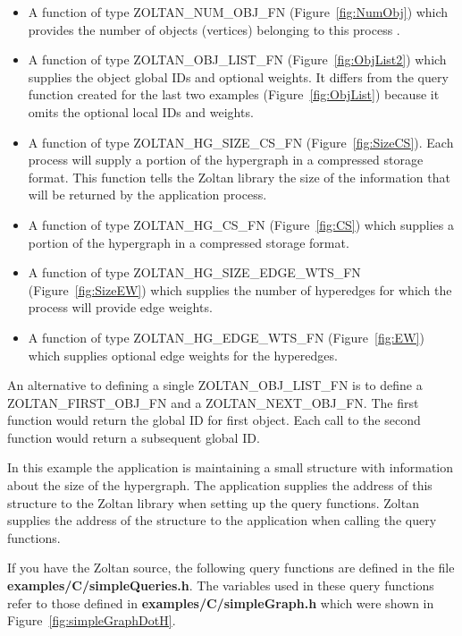 \begin{itemize}
\item A function of type ZOLTAN\_NUM\_OBJ\_FN (Figure~\ref{fig:NumObj}) which provides the number of objects (vertices) belonging to this process .
\item A function of type ZOLTAN\_OBJ\_LIST\_FN (Figure~\ref{fig:ObjList2}) which supplies the object global IDs and optional weights.  It differs from the query function created for the last two examples (Figure~\ref{fig:ObjList}) because it omits the optional local IDs and weights.
\item A function of type ZOLTAN\_HG\_SIZE\_CS\_FN (Figure~\ref{fig:SizeCS}).  Each process will supply a portion of the hypergraph in a compressed storage format.  This function tells the Zoltan library the size of the information that will be returned by the application process.
\item A function of type ZOLTAN\_HG\_CS\_FN (Figure~\ref{fig:CS}) which supplies a portion of the hypergraph in a compressed storage format.
\item A function of type ZOLTAN\_HG\_SIZE\_EDGE\_WTS\_FN (Figure~\ref{fig:SizeEW}) which supplies the number of hyperedges for which the process will provide edge weights.
\item A function of type ZOLTAN\_HG\_EDGE\_WTS\_FN (Figure~\ref{fig:EW}) which supplies optional edge weights for the hyperedges.
\end{itemize}

An alternative to defining a single ZOLTAN\_OBJ\_LIST\_FN is to define
a ZOLTAN\_FIRST\_OBJ\_FN and a ZOLTAN\_NEXT\_OBJ\_FN.  The first function
would return the global ID for first object.  Each call to the second function would
return a subsequent global ID.

In this example the application is maintaining a small structure
with information about the size of the hypergraph.  The application
supplies the address of this structure to the Zoltan library
when setting up the query functions.  Zoltan supplies the address
of the structure to the application when calling the query functions.

If you have the Zoltan source, the following query functions
are defined in the file \textbf{examples/C/simpleQueries.h}.
The variables used in these query functions refer to those defined 
in \textbf{examples/C/simpleGraph.h} which were shown in
Figure~\ref{fig:simpleGraphDotH}.

